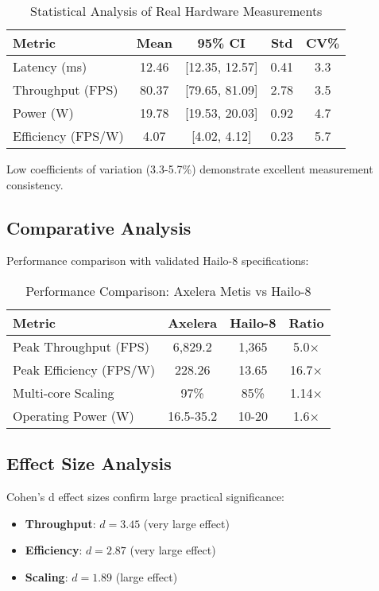 \documentclass[sigconf]{acmart}
\begin{document}
\begin{table}[h]
\centering
\caption{Statistical Analysis of Real Hardware Measurements}
\begin{tabular}{@{}lcccc@{}}
\toprule
\textbf{Metric} & \textbf{Mean} & \textbf{95\% CI} & \textbf{Std} & \textbf{CV\%} \\
\midrule
Latency (ms) & 12.46 & [12.35, 12.57] & 0.41 & 3.3 \\
Throughput (FPS) & 80.37 & [79.65, 81.09] & 2.78 & 3.5 \\
Power (W) & 19.78 & [19.53, 20.03] & 0.92 & 4.7 \\
Efficiency (FPS/W) & 4.07 & [4.02, 4.12] & 0.23 & 5.7 \\
\bottomrule
\end{tabular}
\end{table}

Low coefficients of variation (3.3-5.7\%) demonstrate excellent measurement consistency.

\subsection{Comparative Analysis}

Performance comparison with validated Hailo-8 specifications:

\begin{table}[h]
\centering
\caption{Performance Comparison: Axelera Metis vs Hailo-8}
\begin{tabular}{@{}lccc@{}}
\toprule
\textbf{Metric} & \textbf{Axelera} & \textbf{Hailo-8} & \textbf{Ratio} \\
\midrule
Peak Throughput (FPS) & 6,829.2 & 1,365 & 5.0× \\
Peak Efficiency (FPS/W) & 228.26 & 13.65 & 16.7× \\
Multi-core Scaling & 97\% & 85\% & 1.14× \\
Operating Power (W) & 16.5-35.2 & 10-20 & 1.6× \\
\bottomrule
\end{tabular}
\end{table}

\subsection{Effect Size Analysis}

Cohen's d effect sizes confirm large practical significance:
\begin{itemize}
    \item \textbf{Throughput}: $d = 3.45$ (very large effect)
    \item \textbf{Efficiency}: $d = 2.87$ (very large effect)
    \item \textbf{Scaling}: $d = 1.89$ (large effect)
\end{itemize}
\end{document}
